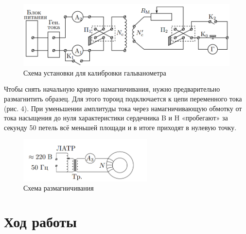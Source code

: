 \documentclass[a4paper, 12pt]{article}
\begin{document}
\begin{figure}[!h]
\begin{center}
\includegraphics[width = 1\textwidth]{Снимок экрана 2024-11-27 235740.png}
\end{center}
\caption{ Схема установки для калибровки гальванометра}
\end{figure}

Чтобы снять начальную кривую
намагничивания, нужно предварительно размагнитить образец.
Для этого тороид подключается
к цепи переменного тока (рис. 4).
При уменьшении амплитуды
тока через намагничивающую
обмотку от тока насыщения до нуля характеристики сердечника B
и H «пробегают» за секунду 50 петель всё меньшей площади и в итоге
приходят в нулевую точку.

\begin{figure}[!h]
\begin{center}
\includegraphics[width = 0.6\textwidth]{Снимок экрана 2024-11-28 000333.png}
\end{center}
\caption{Схема размагничивания}
\end{figure}
\section{Ход работы}
\end{document}
